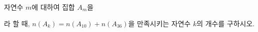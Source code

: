 자연수 $m$에 대하여 집합 $A_m$을\par\smallskip{}\par\smallskip\noindent 라 할 때, $n(A_k)=n(A_{10})+n(A_{36})$을 만족시키는 자연수 $k$의 개수를 구하시오.

